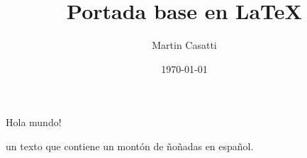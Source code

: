 \documentclass[a4paper,12pt]{article}
\title{Portada base en LaTeX}
\date{\today}
\author{Martin Casatti}
\begin{document}
	\maketitle
	\begin{abstract}
		\lipsum[1-2]
	\end{abstract}

	Hola mundo!
	
	un texto que contiene un montón de ñoñadas en español.
	
	\lipsum[1-1]

%	
%
%
%
\end{document}
